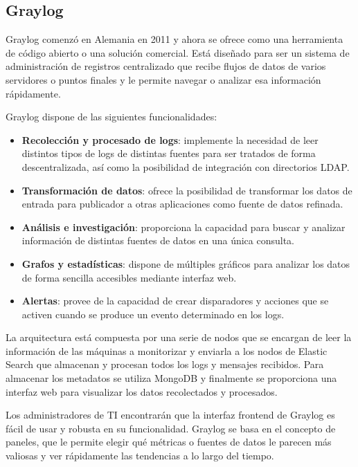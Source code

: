 \subsection{Graylog}

Graylog comenzó en Alemania en 2011 y ahora se ofrece como una herramienta de código abierto o una solución comercial. Está diseñado para ser un sistema de administración de registros centralizado que recibe flujos de datos de varios servidores o puntos finales y le permite navegar o analizar esa información rápidamente.

Graylog dispone de las siguientes funcionalidades:

\begin{itemize}
\item \textbf{Recolección y procesado de logs}: implemente la necesidad de leer distintos tipos de logs de distintas fuentes para ser tratados de forma descentralizada, así como la posibilidad de integración con directorios LDAP.

\item \textbf{Transformación de datos}: ofrece la posibilidad de transformar los datos de entrada para publicador a otras aplicaciones como fuente de datos refinada.

\item \textbf{Análisis e investigación}: proporciona la capacidad para buscar y analizar información  de distintas fuentes de datos en una única consulta.

\item \textbf{Grafos y estadísticas}: dispone de múltiples gráficos para analizar los datos de forma sencilla accesibles mediante interfaz web.

\item \textbf{Alertas}: provee de la capacidad de crear disparadores y acciones que se activen cuando se produce un evento determinado en los logs. 
\end{itemize}

La arquitectura está compuesta por una serie de nodos que se encargan de leer la información de las máquinas a monitorizar y enviarla a los nodos de Elastic Search que almacenan y procesan todos los logs y mensajes recibidos. Para almacenar los metadatos se utiliza MongoDB y finalmente se proporciona una interfaz web para visualizar los datos recolectados y procesados.

Los administradores de TI encontrarán que la interfaz frontend de Graylog es fácil de usar y robusta en su funcionalidad. Graylog se basa en el concepto de paneles, que le permite elegir qué métricas o fuentes de datos le parecen más valiosas y ver rápidamente las tendencias a lo largo del tiempo.

